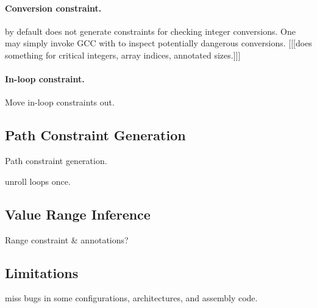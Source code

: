 \paragraph{Conversion constraint.}
\sys by default does not generate constraints for checking integer
conversions.  One may simply invoke GCC with  to
inspect potentially dangerous conversions.
[[[\sys does something for critical integers, array indices, annotated sizes.]]]

\paragraph{In-loop constraint.}
Move in-loop constraints out.

\subsection{Path Constraint Generation}

Path constraint generation.

unroll loops once.

\subsection{Value Range Inference}

Range constraint \& annotations?

\subsection{Limitations}

miss bugs in some configurations, architectures,
and assembly code.
